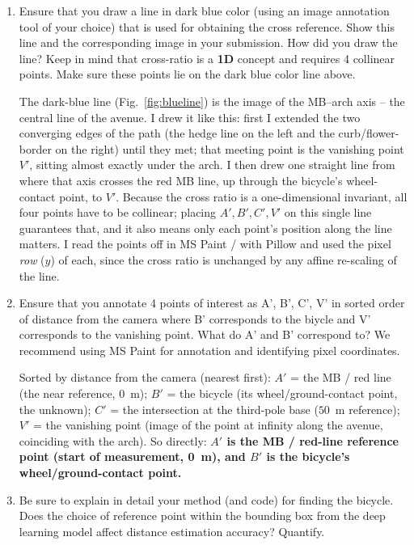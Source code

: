 \begin{enumerate}
\item Ensure that you draw a line in dark blue color (using an image annotation tool of your choice) that is used for obtaining the cross reference.  Show this line and the corresponding image in your submission. How did you draw the line? Keep in mind that cross-ratio is a \textbf{1D} concept and requires 4 collinear points. Make sure these points lie on the dark blue color line above.
\begin{studentSpace}
\noindent The dark-blue line (Fig.~\ref{fig:blueline}) is the image of
the MB--arch axis -- the central line of the avenue. I drew it like this:
first I extended the two converging edges of the path (the hedge line on
the left and the curb/flower-border on the right) until they met; that
meeting point is the vanishing point $V'$, sitting almost exactly under
the arch. I then drew one straight line from where that axis crosses the
red MB line, up through the bicycle's wheel-contact point, to $V'$.
Because the cross ratio is a one-dimensional invariant, all four points
have to be collinear; placing $A',B',C',V'$ on this single line
guarantees that, and it also means only each point's position along the
line matters. I read the points off in MS Paint / with Pillow and used
the pixel \emph{row} ($y$) of each, since the cross ratio is unchanged by
any affine re-scaling of the line.
\end{studentSpace}

\item Ensure that you annotate 4 points of interest as A', B', C', V'  in sorted order of distance from the camera where B' corresponds to the biycle and V' corresponds to the vanishing point.  What do A' and B' correspond to?
We recommend using MS Paint for annotation and identifying pixel coordinates.
\begin{studentSpace}
\noindent Sorted by distance from the camera (nearest first):
$A'$ = the MB / red line (the near reference, $0$~m);
$B'$ = the bicycle (its wheel/ground-contact point, the unknown);
$C'$ = the intersection at the third-pole base ($50$~m reference);
$V'$ = the vanishing point (image of the point at infinity along the
avenue, coinciding with the arch). So directly: \textbf{$A'$ is the MB /
red-line reference point (start of measurement, 0~m), and $B'$ is the
bicycle's wheel/ground-contact point.}
\end{studentSpace}

\item Be sure to  explain in detail your method (and code) for finding the bicycle. Does the choice of reference point within the bounding box from the deep learning model affect distance estimation accuracy? Quantify.
\end{enumerate}

